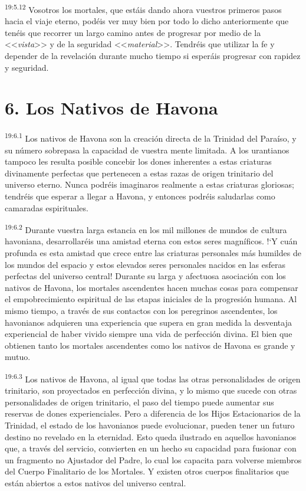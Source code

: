 \par
\textsuperscript{19:5.12} Vosotros los mortales, que estáis dando ahora vuestros primeros pasos hacia el viaje eterno, podéis ver muy bien por todo lo dicho anteriormente que tenéis que recorrer un largo camino antes de progresar por medio de la <<\textit{vista}>> y de la seguridad <<\textit{material}>>. Tendréis que utilizar la fe y depender de la revelación durante mucho tiempo si esperáis progresar con rapidez y seguridad.

\section*{6. Los Nativos de Havona}
\par
\textsuperscript{19:6.1} Los nativos de Havona son la creación directa de la Trinidad del Paraíso, y su número sobrepasa la capacidad de vuestra mente limitada. A los urantianos tampoco les resulta posible concebir los dones inherentes a estas criaturas divinamente perfectas que pertenecen a estas razas de origen trinitario del universo eterno. Nunca podréis imaginaros realmente a estas criaturas gloriosas; tendréis que esperar a llegar a Havona, y entonces podréis saludarlas como camaradas espirituales.

\par
\textsuperscript{19:6.2} Durante vuestra larga estancia en los mil millones de mundos de cultura havoniana, desarrollaréis una amistad eterna con estos seres magníficos. !`Y cuán profunda es esta amistad que crece entre las criaturas personales más humildes de los mundos del espacio y estos elevados seres personales nacidos en las esferas perfectas del universo central! Durante su larga y afectuosa asociación con los nativos de Havona, los mortales ascendentes hacen muchas cosas para compensar el empobrecimiento espiritual de las etapas iniciales de la progresión humana. Al mismo tiempo, a través de sus contactos con los peregrinos ascendentes, los havonianos adquieren una experiencia que supera en gran medida la desventaja experiencial de haber vivido siempre una vida de perfección divina. El bien que obtienen tanto los mortales ascendentes como los nativos de Havona es grande y mutuo.

\par
\textsuperscript{19:6.3} Los nativos de Havona, al igual que todas las otras personalidades de origen trinitario, son proyectados en perfección divina, y lo mismo que sucede con otras personalidades de origen trinitario, el paso del tiempo puede aumentar sus reservas de dones experienciales. Pero a diferencia de los Hijos Estacionarios de la Trinidad, el estado de los havonianos puede evolucionar, pueden tener un futuro destino no revelado en la eternidad. Esto queda ilustrado en aquellos havonianos que, a través del servicio, convierten en un hecho su capacidad para fusionar con un fragmento no Ajustador del Padre, lo cual los capacita para volverse miembros del Cuerpo Finalitario de los Mortales. Y existen otros cuerpos finalitarios que están abiertos a estos nativos del universo central.

